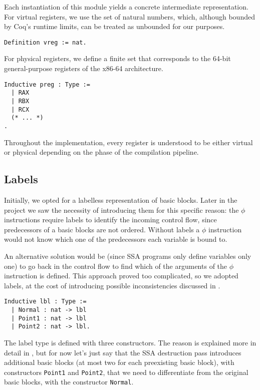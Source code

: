 Each instantiation of this module yields a concrete intermediate representation. For virtual registers, we use the set of natural numbers, which, although bounded by Coq's runtime limits, can be treated as unbounded for our purposes.

\begin{lstlisting}[style=Coq]
Definition vreg := nat.
\end{lstlisting}

For physical registers, we define a finite set that corresponds to the 64-bit general-purpose registers of the x86-64 architecture.

\begin{lstlisting}[style=Coq]
Inductive preg : Type :=
  | RAX
  | RBX
  | RCX
  (* ... *)
.
\end{lstlisting}

Throughout the implementation, every register is understood to be either virtual or physical depending on the phase of the compilation pipeline.

\subsection{Labels}

Initially, we opted for a labelless representation of basic blocks.
Later in the project we saw the necessity of introducing them for this specific reason: the $\phi$ instructions require labels to identify the incoming control flow, since predecessors of a basic blocks are not ordered. Without labels a $\phi$ instruction would not know which one of the predecessors each variable is bound to.

An alternative solution would be (since SSA programs only define variables only one) to go back in the control flow to find which of the arguments of the $\phi$ instruction is defined. This approach proved too complicated, so we adopted labels, at the cost of introducing possible inconsistencies discussed in .

\begin{lstlisting}[style=Coq]
Inductive lbl : Type :=
  | Normal : nat -> lbl
  | Point1 : nat -> lbl
  | Point2 : nat -> lbl.
\end{lstlisting}

The label type is defined with three constructors. The reason is explained more in detail in , but for now let's just say that the SSA destruction pass introduces additional basic blocks (at most two for each preexisting basic block), with constructors \texttt{Point1} and \texttt{Point2}, that we need to differentiate from the original basic blocks, with the constructor \texttt{Normal}.

